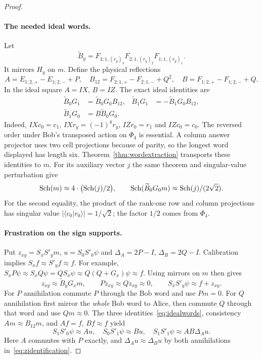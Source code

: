 \begin{proof}
\paragraph{The needed ideal words.}
Let
\[
\widetilde B_y=F_{3;1,(r_y)_3}F_{2;1,(r_y)_2}F_{1;1,(r_y)_1}.
\]
It mirrors $H_y$ on $m$. Define the physical reflections
\[
A=E_{1;2,+}-E_{1;2,-}+P,\quad
B_{12}=F_{2;1,+}-F_{2;1,-}+Q^2,\quad
B=F_{1;2,+}-F_{1;2,-}+Q.
\]
In the ideal square $A=IX$, $B=IZ$. The exact ideal identities are
\begin{align}\label{eq:idealwords}
\widetilde B_0G_1&=\widetilde B_0G_0B_{12},&
\widetilde B_1G_1&=-\widetilde B_1G_0B_{12},\nonumber\\
\widetilde B_1G_0&=B\widetilde B_0G_0.&&
\end{align}
Indeed, $IXc_0=c_1$, $IXr_y=(-1)^yr_y$, $IZr_0=r_1$ and $IZc_0=c_0$.
The reversed order under Bob's transposed action on $\Phi_4$ is essential.
A column answer projector uses two cell projections because of parity,
so the longest word displayed has length six.
Theorem~\ref{thm:wordextraction} transports these identities to $m$.
For its auxiliary vector $j$ the same theorem and singular-value
perturbation give
\begin{equation}\label{eq:robustnormalizations}
\operatorname{Sch}(m)\approx4\mathbin{\cdot}\bigl(\operatorname{Sch}(j)/2\bigr),\qquad
\operatorname{Sch}(\widetilde B_0G_0m)\approx\operatorname{Sch}(j)/(2\sqrt2).
\end{equation}
For the second equality, the product of the rank-one row and column
projections has singular value $|\langle c_0|r_0\rangle|=1/\sqrt2$;
the factor $1/2$ comes from $\Phi_4$.

\paragraph{Frustration on the sign supports.}
Put $z_{xy}=S_xS'_ym$, $u=S_0S'_0\psi$ and
$\Delta_A=2P-I$, $\Delta_B=2Q-I$. Calibration implies
$S_xf\approx S'_yf\approx f$. For example,
$S_xP\psi\approx S_xQ\psi=QS_x\psi\approx Q(Q+G_x)\psi\approx f$.
Using mirrors on $m$ then gives
\begin{equation}\label{eq:zidentification}
z_{xy}\approx\widetilde B_yG_xm,\qquad
Pz_{xy}\approx Qz_{xy}\approx0,\qquad
S_xS'_y\psi\approx f+z_{xy}.
\end{equation}
For $P$ annihilation commute $P$ through the Bob word and use $Pm=0$.
For $Q$ annihilation first mirror the \emph{whole} Bob word to Alice,
then commute $Q$ through that word and use $Qm\approx0$.
The three identities~\eqref{eq:idealwords}, consistency $Am\approx B_{12}m$,
and $Af=f$, $Bf\approx f$ yield
\begin{equation}\label{eq:signidentifications}
S_1S'_0\psi\approx Au,\quad S_0S'_1\psi\approx Bu,\quad
S_1S'_1\psi\approx AB\Delta_Au.
\end{equation}
Here $A$ commutes with $P$ exactly, and
$\Delta_Au\approx\Delta_Bu$ by both annihilations
in~\eqref{eq:zidentification}.


\end{proof}
